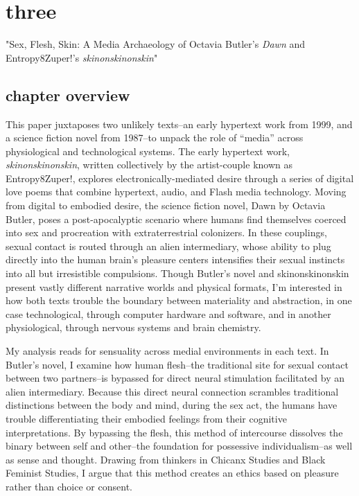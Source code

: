 \documentclass[11pt]{article}
\author{Filipa  Calado}
\date{\today}
\title{}
\begin{document}
\tableofcontents

\section{three}
\label{sec:org0134620}
"Sex, Flesh, Skin: A Media Archaeology of Octavia Butler's \emph{Dawn} and
Entropy8Zuper!'s \emph{skinonskinonskin}"

\subsection{chapter overview}
\label{sec:org5358925}
This paper juxtaposes two unlikely texts--an early hypertext work from
1999, and a science fiction novel from 1987--to unpack the role of
“media” across physiological and technological systems. The early
hypertext work, \emph{skinonskinonskin}, written collectively by the
artist-couple known as Entropy8Zuper!, explores
electronically-mediated desire through a series of digital love poems
that combine hypertext, audio, and Flash media technology. Moving from
digital to embodied desire, the science fiction novel, Dawn by Octavia
Butler, poses a post-apocalyptic scenario where humans find themselves
coerced into sex and procreation with extraterrestrial colonizers. In
these couplings, sexual contact is routed through an alien
intermediary, whose ability to plug directly into the human brain’s
pleasure centers intensifies their sexual instincts into all but
irresistible compulsions. Though Butler’s novel and skinonskinonskin
present vastly different narrative worlds and physical formats, I’m
interested in how both texts trouble the boundary between materiality
and abstraction, in one case technological, through computer hardware
and software, and in another physiological, through nervous systems
and brain chemistry.

My analysis reads for sensuality across medial environments in each
text. In Butler’s novel, I examine how human flesh--the traditional
site for sexual contact between two partners--is bypassed for direct
neural stimulation facilitated by an alien intermediary. Because this
direct neural connection scrambles traditional distinctions between
the body and mind, during the sex act, the humans have trouble
differentiating their embodied feelings from their cognitive
interpretations. By bypassing the flesh, this method of intercourse
dissolves the binary between self and other--the foundation for
possessive individualism--as well as sense and thought. Drawing from
thinkers in Chicanx Studies and Black Feminist Studies, I argue that
this method creates an ethics based on pleasure rather than choice or
consent.
\end{document}
